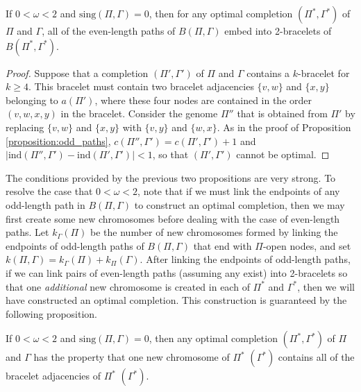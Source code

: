 \begin{proposition}
If $0 < \omega < 2$ and $\mathrm{sing}(\Pi, \Gamma) = 0$, then for any optimal completion $(\Pi^*, \Gamma^*)$ of $\Pi$ and $\Gamma$, all of the even-length paths of $B(\Pi, \Gamma)$ embed into 2-bracelets of $B(\Pi^*, \Gamma^*)$.
\label{proposition:even_paths}
\end{proposition}

\begin{proof}
Suppose that a completion $(\Pi', \Gamma')$ of $\Pi$ and $\Gamma$ contains a $k$-bracelet for $k \geq 4$.  This bracelet must contain two bracelet adjacencies $\{v, w\}$ and $\{x, y\}$ belonging to $a(\Pi')$, where these four nodes are contained in the order $(v, w, x, y)$ in the bracelet. Consider the genome $\Pi''$ that is obtained from $\Pi'$ by replacing $\{v, w\}$ and $\{x, y\}$ with $\{v,y\}$ and $\{w, x\}$.  As in the proof of Proposition \ref{proposition:odd_paths}, $c(\Pi'', \Gamma') = c(\Pi', \Gamma') + 1$ and $|\mathrm{ind}(\Pi'', \Gamma') - \mathrm{ind}(\Pi', \Gamma')| < 1$, so that $(\Pi', \Gamma')$ cannot be optimal.
\end{proof}

\noindent The conditions provided by the previous two propositions are very strong. To resolve the case that $0 < \omega < 2$, note that if we must link the endpoints of any odd-length path in $B(\Pi, \Gamma)$ to construct an optimal completion, then we may first create some new chromosomes before dealing with the case of even-length paths.  Let $k_{\Gamma}(\Pi)$ be the number of new chromosomes formed by linking the endpoints of odd-length paths of $B(\Pi, \Gamma)$ that end with $\Pi$-open nodes, and set $k(\Pi, \Gamma) = k_{\Gamma}(\Pi) + k_{\Pi}(\Gamma)$.  After linking the endpoints of odd-length paths, if we can link pairs of even-length paths (assuming any exist) into 2-bracelets so that one \emph{additional} new chromosome is created in each of $\Pi^{*}$ and $\Gamma^{*}$, then we will have constructed an optimal completion.  This construction is guaranteed by the following proposition.

\begin{proposition}
If $0 < \omega < 2$ and $\mathrm{sing}(\Pi, \Gamma) = 0$, then any optimal completion $(\Pi^*, \Gamma^*)$ of $\Pi$ and $\Gamma$ has the property that one new chromosome of $\Pi^{*}$ $(\Gamma^{*})$ contains all of the bracelet adjacencies of $\Pi^{*}$ $(\Gamma^{*})$.
\end{proposition}

